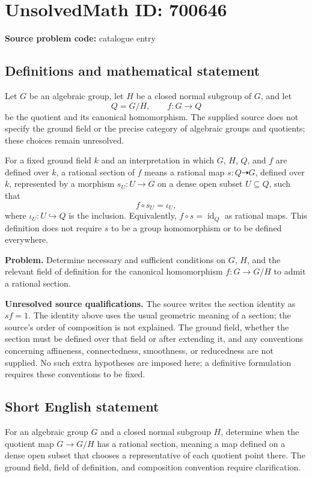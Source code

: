 \documentclass[11pt]{article}
\begin{document}
\section*{UnsolvedMath ID: 700646}
\textbf{Source problem code:} catalogue entry
\subsection{Definitions and mathematical statement}
Let \(G\) be an algebraic group, let \(H\) be a closed normal subgroup of \(G\), and let
\[
Q=G/H,\qquad f:G\longrightarrow Q
\]
be the quotient and its canonical homomorphism. The supplied source does not specify the ground field or the precise category of algebraic groups and quotients; these choices remain unresolved.

For a fixed ground field \(k\) and an interpretation in which \(G\), \(H\), \(Q\), and \(f\) are defined over \(k\), a rational section of \(f\) means a rational map \(s:Q\dashrightarrow G\), defined over \(k\), represented by a morphism \(s_U:U\to G\) on a dense open subset \(U\subseteq Q\), such that
\[
f\circ s_U=\iota_U,
\]
where \(\iota_U:U\hookrightarrow Q\) is the inclusion. Equivalently, \(f\circ s=\operatorname{id}_Q\) as rational maps. This definition does not require \(s\) to be a group homomorphism or to be defined everywhere.

\textbf{Problem.} Determine necessary and sufficient conditions on \(G\), \(H\), and the relevant field of definition for the canonical homomorphism \(f:G\to G/H\) to admit a rational section.

\textbf{Unresolved source qualifications.} The source writes the section identity as \(sf=1\). The identity above uses the usual geometric meaning of a section; the source's order of composition is not explained. The ground field, whether the section must be defined over that field or after extending it, and any conventions concerning affineness, connectedness, smoothness, or reducedness are not supplied. No such extra hypotheses are imposed here; a definitive formulation requires these conventions to be fixed.
\subsection{Short English statement}
For an algebraic group \(G\) and a closed normal subgroup \(H\), determine when the quotient map \(G\to G/H\) has a rational section, meaning a map defined on a dense open subset that chooses a representative of each quotient point there. The ground field, field of definition, and composition convention require clarification.
\end{document}

